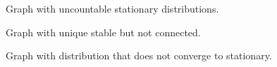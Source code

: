 
Graph with uncountable stationary distributions.

Graph with unique stable but not connected.

Graph with distribution that does not converge to stationary.


